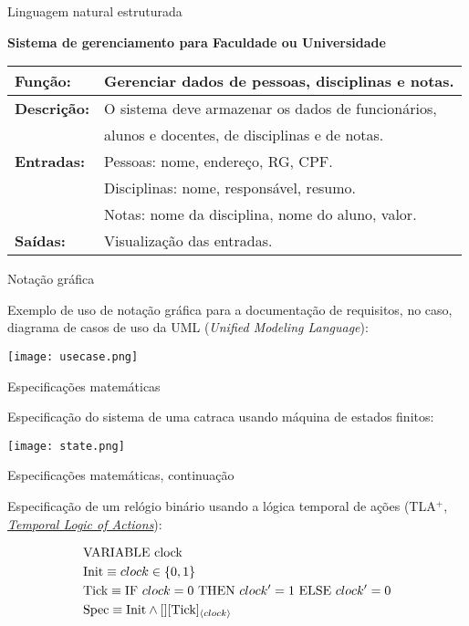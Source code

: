 \begin{frame}{Linguagem natural estruturada}

  {\bf Sistema de gerenciamento para Faculdade ou Universidade}\\\bigskip

  \begin{tabular}[h]{|l|l|}\hline
    \bf Função: & Gerenciar dados de pessoas, disciplinas e notas.\\\hline
    \bf Descrição: & O sistema deve armazenar os dados de funcionários, \\
    & alunos e docentes, de disciplinas e de notas.\\\hline
    \bf Entradas: & Pessoas: nome, endereço, RG, CPF.\\
                & Disciplinas: nome, responsável, resumo.\\
                & Notas: nome da disciplina, nome do aluno, valor.\\\hline
    \bf Saídas: & Visualização das entradas.\\\hline
    
  \end{tabular}
\end{frame}

\begin{frame}{Notação gráfica}
  
  Exemplo de uso de notação gráfica para a documentação de requisitos, no 
  caso, diagrama de casos de uso da UML ({\em Unified Modeling Language}):

  \begin{center}
    \texttt{[image: usecase.png]}
  \end{center}

\end{frame}

\begin{frame}{Especificações matemáticas}
  
  Especificação do sistema de uma catraca usando máquina de estados finitos:\bigskip
\begin{center}
  \texttt{[image: state.png]}
\end{center}
\end{frame}

\begin{frame}[fragile]{Especificações matemáticas, continuação}

  Especificação de um relógio binário usando a lógica temporal de ações (TLA$^+$, \href{http://research.microsoft.com/en-us/um/people/lamport/tla/tla.html}{\em Temporal Logic of Actions}):

\begin{multline}
  \text{VARIABLE clock}\hfill\\
  \text{Init} \equiv clock \in \{0, 1\}\hfill\\
  \text{Tick} \equiv \text{IF}\ clock = 0\ \text{THEN}\ clock' = 1\ \text{ELSE}\ clock' = 0\hfill\\
  \text{Spec} \equiv \text{Init} \land [][\text{Tick}]_{\langle clock\rangle}\hfill
\end{multline}

\end{frame}

